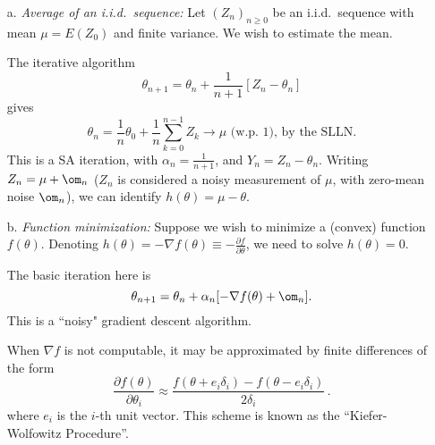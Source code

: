 \begin{itemize}
\item[a.]
{\em Average of an i.i.d.\ sequence:}
Let $(Z_n)_{n \ge 0}$ be an i.i.d.\  sequence with mean $\mu = E(Z_0)$ and
finite variance.  We wish to estimate the mean.

The iterative algorithm
$$
\theta_{n+1} = \theta_n + \frac{1}{n+1} [Z_n - \theta_n]
$$
gives
$$
\theta_n = \frac{1}{n} \theta_0 + \frac{1}{n} \sum_{k=0}^{n-1} Z_k \to
\mu \text{\ \ (w.p.~1),\ \ \ by the SLLN} .
$$
This is a SA iteration, with $\alpha_n=\frac{1}{n+1}$, and
$Y_n = Z_n - \theta_n$.
Writing $Z_n=\mu+\om_n$ ($Z_n$ is considered a noisy measurement of $\mu$,
with zero-mean noise $\om_n$), we can identify
$h(\theta) = \mu - \theta$.

\item[b.]
{\em Function minimization:} Suppose we wish to minimize a (convex) function $f(\theta)$.
Denoting $h(\theta) = - \nabla f(\theta) \equiv -\frac{\partial f}{\partial
\theta}$, we need to solve $h(\theta) = 0$.

The basic iteration here is
$$
\theta_{n+1} = \theta_n + \alpha_n [-\nabla f (\theta) + \om_n].
$$
This is a ``noisy" gradient descent algorithm.

When $\nabla f$ is not computable, it may be approximated by finite
differences of the form
$$
\frac{\partial f(\theta)}{\partial \theta_i} \approx
\frac{f(\theta+ e_i\delta_i) - f(\theta-e_i\delta_i)}{2\delta_i}\,.
$$
where $e_i$ is the $i$-th unit vector.
This scheme is known as the ``Kiefer-Wolfowitz Procedure''.
\end{itemize}

